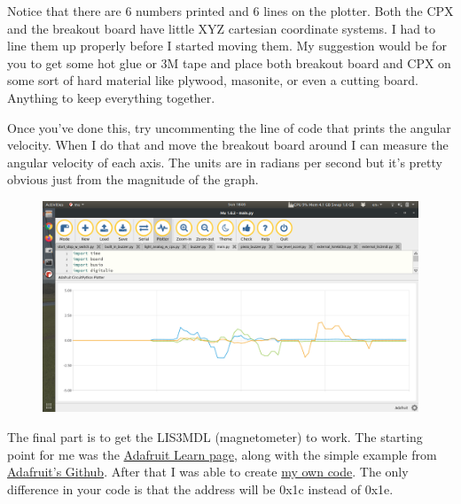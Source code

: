 Notice that there are 6 numbers printed and 6 lines on the plotter. Both the CPX and the breakout board have little XYZ cartesian coordinate systems. I had to line them up properly before I started moving them. My suggestion would be for you to get some hot glue or 3M tape and place both breakout board and CPX on some sort of hard material like plywood, masonite, or even a cutting board. Anything to keep everything together.

Once you’ve done this, try uncommenting the line of code that prints the angular velocity. When I do that and move the breakout board around I can measure the angular velocity of each axis. The units are in radians per second but it’s pretty obvious just from the magnitude of the graph.
\begin{figure}[H]
  \begin{center}
    \includegraphics[width=\textwidth]{Figures/imu_mag.png}
  \end{center}
\end{figure}
The final part is to get the LIS3MDL (magnetometer) to work. The starting point for me was the \href{https://learn.adafruit.com/lis3mdl-triple-axis-magnetometer/python-circuitpython}{Adafruit Learn page}, along with the simple example from \href{https://github.com/adafruit/Adafruit_CircuitPython_LIS3MDL/blob/master/examples/lis3mdl_simpletest.py}{Adafruit's Github}. After that I was able to create \href{https://github.com/cmontalvo251/Microcontrollers/blob/master/Circuit_Playground/CircuitPython/Accelerometer/external_lis3mdl.py}{my own code}. The only difference in your code is that the address will be 0x1c instead of 0x1e.
